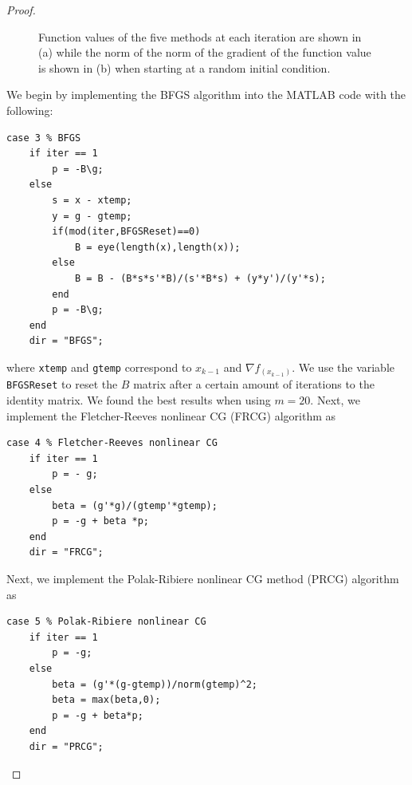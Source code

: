 \documentclass[12pt]{report}
\begin{document}
\begin{problem}
\begin{proof}
\begin{figure}[H]
\begin{subfigure}[b]{0.5\linewidth}
                \caption{}
                \label{figRandom:b}
                \vspace{4ex}
            \end{subfigure}
            \caption{Function values of the five methods at each iteration are shown in (a) while the norm of the norm of the gradient of the function value is shown in (b) when starting at a random initial condition.}
            \label{figRandom}
        \end{figure}

        
        We begin by implementing the BFGS algorithm into the MATLAB code with the following:
        \begin{lstlisting}[style=Matlab-editor]
case 3 % BFGS
    if iter == 1
        p = -B\g;
    else
        s = x - xtemp;
        y = g - gtemp;
        if(mod(iter,BFGSReset)==0)
            B = eye(length(x),length(x));
        else
            B = B - (B*s*s'*B)/(s'*B*s) + (y*y')/(y'*s);
        end
        p = -B\g;
    end
    dir = "BFGS";
        \end{lstlisting}
        where \verb+xtemp+ and \verb+gtemp+ correspond to $x_{k-1}$ and $\nabla f_(x_{k-1})$. We use the variable \verb+BFGSReset+ to reset the $B$ matrix after a certain amount of iterations to the identity matrix. We found the best results when using $m=20$. Next, we implement the Fletcher-Reeves nonlinear CG (FRCG) algorithm as
        \begin{lstlisting}[style=Matlab-editor]
case 4 % Fletcher-Reeves nonlinear CG
    if iter == 1
        p = - g;
    else 
        beta = (g'*g)/(gtemp'*gtemp);
        p = -g + beta *p;
    end 
    dir = "FRCG";
        \end{lstlisting}
        Next, we implement the Polak-Ribiere nonlinear CG method (PRCG) algorithm as 
        \begin{lstlisting}[style=Matlab-editor]
case 5 % Polak-Ribiere nonlinear CG
    if iter == 1
        p = -g;
    else
        beta = (g'*(g-gtemp))/norm(gtemp)^2;
        beta = max(beta,0);
        p = -g + beta*p;
    end
    dir = "PRCG";
        \end{lstlisting}

\end{proof}
\end{problem}
\end{document}
